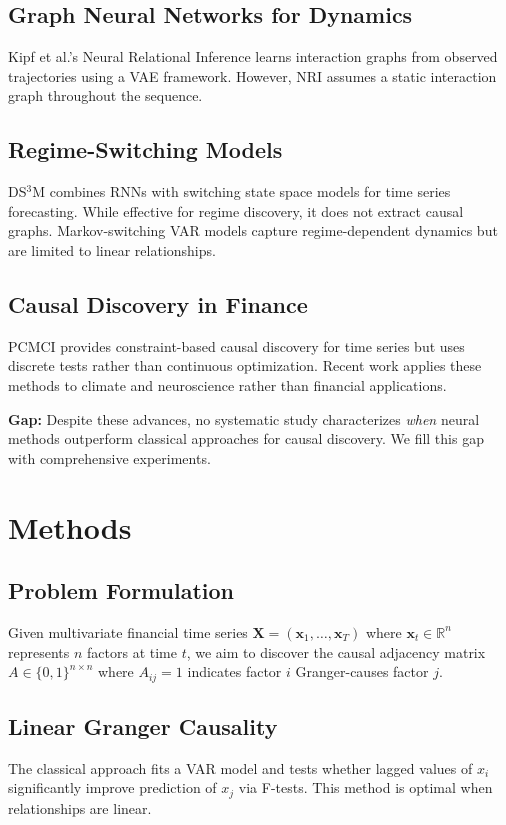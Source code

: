 \documentclass[sigconf,nonacm]{acmart}
\begin{document}
\subsection{Graph Neural Networks for Dynamics}
Kipf et al.'s Neural Relational Inference \cite{kipf2018neural} learns interaction graphs from observed trajectories using a VAE framework. However, NRI assumes a static interaction graph throughout the sequence.

\subsection{Regime-Switching Models}
DS$^3$M \cite{xu2021deep} combines RNNs with switching state space models for time series forecasting. While effective for regime discovery, it does not extract causal graphs. Markov-switching VAR models capture regime-dependent dynamics but are limited to linear relationships.

\subsection{Causal Discovery in Finance}
PCMCI \cite{runge2019detecting} provides constraint-based causal discovery for time series but uses discrete tests rather than continuous optimization. Recent work applies these methods to climate and neuroscience rather than financial applications.

\textbf{Gap:} Despite these advances, no systematic study characterizes \textit{when} neural methods outperform classical approaches for causal discovery. We fill this gap with comprehensive experiments.

\section{Methods}

\subsection{Problem Formulation}
Given multivariate financial time series $\mathbf{X} = (\mathbf{x}_1, \ldots, \mathbf{x}_T)$ where $\mathbf{x}_t \in \mathbb{R}^n$ represents $n$ factors at time $t$, we aim to discover the causal adjacency matrix $A \in \{0,1\}^{n \times n}$ where $A_{ij} = 1$ indicates factor $i$ Granger-causes factor $j$.

\subsection{Linear Granger Causality}
The classical approach fits a VAR model and tests whether lagged values of $x_i$ significantly improve prediction of $x_j$ via F-tests. This method is optimal when relationships are linear.
\end{document}
